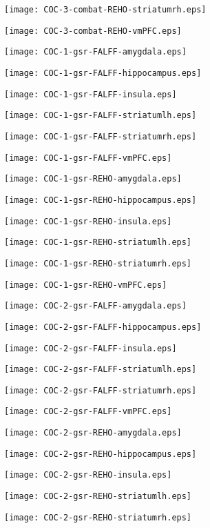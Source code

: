 \documentclass{article}
\begin{document}

\newpage
\texttt{[image: COC-3-combat-REHO-striatumrh.eps]}

\newpage
\texttt{[image: COC-3-combat-REHO-vmPFC.eps]}

\newpage
\texttt{[image: COC-1-gsr-FALFF-amygdala.eps]}

\newpage
\texttt{[image: COC-1-gsr-FALFF-hippocampus.eps]}

\newpage
\texttt{[image: COC-1-gsr-FALFF-insula.eps]}

\newpage
\texttt{[image: COC-1-gsr-FALFF-striatumlh.eps]}

\newpage
\texttt{[image: COC-1-gsr-FALFF-striatumrh.eps]}

\newpage
\texttt{[image: COC-1-gsr-FALFF-vmPFC.eps]}

\newpage
\texttt{[image: COC-1-gsr-REHO-amygdala.eps]}

\newpage
\texttt{[image: COC-1-gsr-REHO-hippocampus.eps]}

\newpage
\texttt{[image: COC-1-gsr-REHO-insula.eps]}

\newpage
\texttt{[image: COC-1-gsr-REHO-striatumlh.eps]}

\newpage
\texttt{[image: COC-1-gsr-REHO-striatumrh.eps]}

\newpage
\texttt{[image: COC-1-gsr-REHO-vmPFC.eps]}

\newpage
\texttt{[image: COC-2-gsr-FALFF-amygdala.eps]}

\newpage
\texttt{[image: COC-2-gsr-FALFF-hippocampus.eps]}

\newpage
\texttt{[image: COC-2-gsr-FALFF-insula.eps]}

\newpage
\texttt{[image: COC-2-gsr-FALFF-striatumlh.eps]}

\newpage
\texttt{[image: COC-2-gsr-FALFF-striatumrh.eps]}

\newpage
\texttt{[image: COC-2-gsr-FALFF-vmPFC.eps]}

\newpage
\texttt{[image: COC-2-gsr-REHO-amygdala.eps]}

\newpage
\texttt{[image: COC-2-gsr-REHO-hippocampus.eps]}

\newpage
\texttt{[image: COC-2-gsr-REHO-insula.eps]}

\newpage
\texttt{[image: COC-2-gsr-REHO-striatumlh.eps]}

\newpage
\texttt{[image: COC-2-gsr-REHO-striatumrh.eps]}
\end{document}
